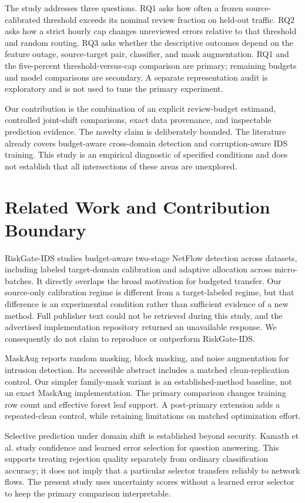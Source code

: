 \documentclass[manuscript,screen,nonacm]{acmart}
\begin{document}
The study addresses three questions. RQ1 asks how often a frozen source-calibrated threshold exceeds its nominal review fraction on held-out traffic. RQ2 asks how a strict hourly cap changes unreviewed errors relative to that threshold and random routing. RQ3 asks whether the descriptive outcomes depend on the feature outage, source-target pair, classifier, and mask augmentation. RQ1 and the five-percent threshold-versus-cap comparison are primary; remaining budgets and model comparisons are secondary. A separate representation audit is exploratory and is not used to tune the primary experiment.

Our contribution is the combination of an explicit review-budget estimand, controlled joint-shift comparisons, exact data provenance, and inspectable prediction evidence. The novelty claim is deliberately bounded. The literature already covers budget-aware cross-domain detection and corruption-aware IDS training. This study is an empirical diagnostic of specified conditions and does not establish that all intersections of these areas are unexplored.

\section{Related Work and Contribution Boundary}
RiskGate-IDS studies budget-aware two-stage NetFlow detection across datasets, including labeled target-domain calibration and adaptive allocation across micro-batches\cite{riskgate}. It directly overlaps the broad motivation for budgeted transfer. Our source-only calibration regime is different from a target-labeled regime, but that difference is an experimental condition rather than sufficient evidence of a new method. Full publisher text could not be retrieved during this study, and the advertised implementation repository returned an unavailable response. We consequently do not claim to reproduce or outperform RiskGate-IDS.

MaskAug reports random masking, block masking, and noise augmentation for intrusion detection\cite{maskaug}. Its accessible abstract includes a matched clean-replication control. Our simpler family-mask variant is an established-method baseline, not an exact MaskAug implementation. The primary comparison changes training row count and effective forest leaf support. A post-primary extension adds a repeated-clean control, while retaining limitations on matched optimization effort.

Selective prediction under domain shift is established beyond security. Kamath et al. study confidence and learned error selection for question answering\cite{selective}. This supports treating rejection quality separately from ordinary classification accuracy; it does not imply that a particular selector transfers reliably to network flows. The present study uses uncertainty scores without a learned error selector to keep the primary comparison interpretable.
\end{document}
